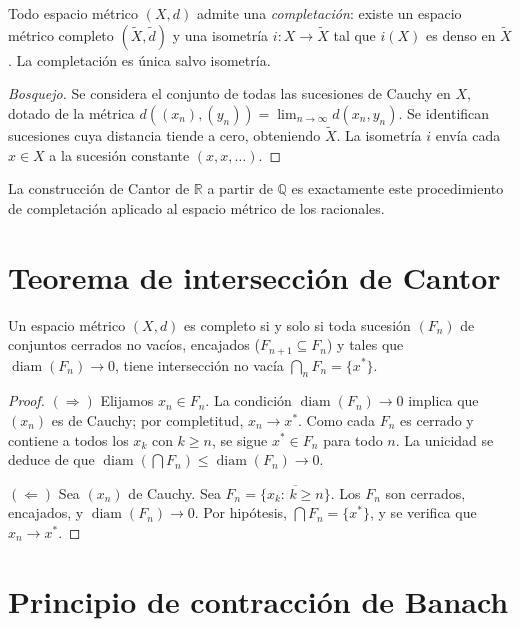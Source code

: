 \begin{theorem}
\label{teo:completacion}
Todo espacio métrico $(X,d)$ admite una \emph{completación}: existe un espacio métrico completo $(\widetilde{X},\widetilde{d})$ y una isometría $i\colon X\to\widetilde{X}$ tal que $i(X)$ es denso en $\widetilde{X}$. La completación es única salvo isometría.
\end{theorem}
\begin{proof}[Bosquejo]
Se considera el conjunto de todas las sucesiones de Cauchy en $X$, dotado de la métrica $d((x_n),(y_n))=\lim_{n\to\infty}d(x_n,y_n)$. Se identifican sucesiones cuya distancia tiende a cero, obteniendo $\widetilde{X}$. La isometría $i$ envía cada $x\in X$ a la sucesión constante $(x,x,\dots)$.
\end{proof}

\begin{remark}
La construcción de Cantor de $\mathbb{R}$ a partir de $\mathbb{Q}$ es exactamente este procedimiento de completación aplicado al espacio métrico de los racionales.
\end{remark}

\section{Teorema de intersección de Cantor}

\begin{theorem}
\label{teo:cantor-interseccion}
Un espacio métrico $(X,d)$ es completo si y solo si toda sucesión $(F_n)$ de conjuntos cerrados no vacíos, encajados ($F_{n+1}\subseteq F_n$) y tales que $\operatorname{diam}(F_n)\to 0$, tiene intersección no vacía $\bigcap_n F_n=\{x^*\}$.
\end{theorem}
\begin{proof}
$(\Rightarrow)$ Elijamos $x_n\in F_n$. La condición $\operatorname{diam}(F_n)\to 0$ implica que $(x_n)$ es de Cauchy; por completitud, $x_n\to x^*$. Como cada $F_n$ es cerrado y contiene a todos los $x_k$ con $k\geq n$, se sigue $x^*\in F_n$ para todo $n$. La unicidad se deduce de que $\operatorname{diam}(\bigcap F_n)\leq\operatorname{diam}(F_n)\to 0$.

$(\Leftarrow)$ Sea $(x_n)$ de Cauchy. Sea $F_n=\overline{\{x_k:\,k\geq n\}}$. Los $F_n$ son cerrados, encajados, y $\operatorname{diam}(F_n)\to 0$. Por hipótesis, $\bigcap F_n=\{x^*\}$, y se verifica que $x_n\to x^*$.
\end{proof}

\section{Principio de contracción de Banach}

